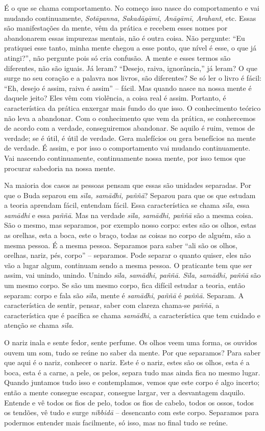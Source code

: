 É o que se chama comportamento. No começo isso nasce do
comportamento e vai mudando continuamente, \textit{Sotāpanna,
Sakadāgāmi, Anāgāmī, Arahant}, etc. Essas são manifestações
da mente, vêm da prática e recebem esses nomes por abandonarem essas
impurezas mentais, não é outra coisa. Não pergunte: “Eu pratiquei esse
tanto, minha mente chegou a esse ponto, que nível é esse, o que já
atingi?”, não pergunte pois só cria confusão. A mente e esses termos
são diferentes, não são iguais. Já leram? “Desejo, raiva, ignorância,”
já leram? O que surge no seu coração e a palavra nos livros, são
diferentes? Se só ler o livro é fácil: “Eh, desejo é assim, raiva é
assim” – fácil. Mas quando nasce na nossa mente é daquele jeito? Eles
vêm com violência, a coisa real é assim. Portanto, é característica da
prática enxergar mais fundo do que isso. O conhecimento teórico não
leva a abandonar. Com o conhecimento que vem da prática, se conhercemos
de acordo com a verdade, conseguiremos abandonar. Se aquilo é ruim,
vemos de verdade; se é útil, é útil de verdade. Gera malefícios ou gera
benefícios na mente de verdade. É assim, e por isso o comportamento vai
mudando continuamente. Vai nascendo continuamente, continuamente nossa
mente, por isso temos que procurar sabedoria na nossa mente. 

Na maioria dos casos as pessoas pensam que essas são unidades
separadas. Por que o Buda separou em \textit{sīla, samādhi,
paññā}? Separou para que os que estudam a teoria aprendam fácil,
entendam fácil. Essa característica se chama \textit{sīla}, essa
\textit{samādhi} e essa \textit{paññā}. Mas na verdade
\textit{sīla, samādhi, paññā} são a mesma coisa. São o mesmo,
mas separamos, por exemplo nosso corpo: estes são os olhos, estas as
orelhas, esta a boca, este o braço, todas as coisas no corpo de alguém,
são a mesma pessoa. É a mesma pessoa. Separamos para saber “ali são os
olhos, orelhas, nariz, pés, corpo” – separamos. Pode separar o quanto
quiser, eles não vão a lugar algum, continuam sendo a mesma pessoa. O
praticante tem que ser assim, vai unindo, unindo. Unindo
\textit{sīla, samādhi, paññā. Sīla, samādhi, paññā} são
um mesmo corpo. Se são um mesmo corpo, fica difícil estudar a teoria,
então separam: corpo e fala são \textit{sīla}, mente é
\textit{samādhi}, \textit{paññā} é \textit{paññā}. Separam. A
característica de sentir, pensar, saber com clareza chama-se
\textit{paññā}, a característica que é pacífica se chama
\textit{samādhi}, a característica que tem cuidado e atenção se chama
\textit{sīla}. 

O nariz inala e sente fedor, sente perfume. Os olhos veem uma forma,
os ouvidos ouvem um som, tudo se reúne no saber da mente. Por que
separamos? Para saber que aqui é o nariz, conhecer o nariz. Este é o
nariz, estes são os olhos, esta é a boca, esta é a carne, a pele, os
pelos, separa tudo mas ainda fica no mesmo lugar. Quando juntamos tudo
isso e contemplamos, vemos que este corpo é algo incerto; então a mente
consegue escapar, consegue largar, ver a desvantagem daquilo. Entende e
vê todos os fios de pelo, todos os fios de cabelo, todos os ossos,
todos os tendões, vê tudo e surge \textit{nibbidā} – desencanto com
este corpo. Separamos para podermos entender mais facilmente, só isso,
mas no final tudo se reúne. 

